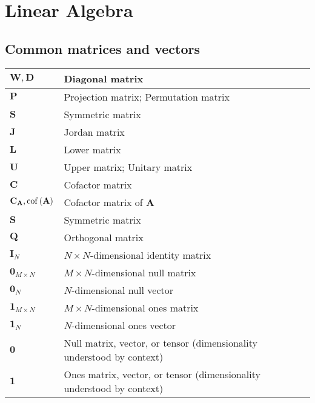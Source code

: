 \section{Linear Algebra}
\subsection{Common matrices and vectors}
\begin{xltabular}{\textwidth}{XX}
	\(\mathbf{W}, \mathbf{D}\)                  & Diagonal matrix                                                       \\ \hline
	\(\mathbf{P}\)                              & Projection matrix; Permutation matrix                                 \\ \hline
	\(\mathbf{S}\)                              & Symmetric matrix                                 \\ \hline
	\(\mathbf{J}\)                              & Jordan matrix                                                         \\ \hline
	\(\mathbf{L}\)                              & Lower matrix                                                          \\ \hline
	\(\mathbf{U}\)                              & Upper matrix; Unitary matrix                                                          \\ \hline
	\(\mathbf{C}\)                              & Cofactor matrix                                                       \\ \hline
	\(\mathbf{C}_\mathbf{A}, \operatorname{cof}\left(\mathbf{A}\right)\) & Cofactor matrix of \(\mathbf{A}\)                                     \\ \hline
	\(\mathbf{S}\)                              & Symmetric matrix                                                      \\ \hline
	\(\mathbf{Q}\)                              & Orthogonal matrix                                                     \\ \hline
	\(\mathbf{I}_N\)                            & \(N\times N\)-dimensional identity matrix                             \\ \hline
	\(\mathbf{0}_{M\times N}\)                  & \(M\times N\)-dimensional null matrix                                 \\ \hline
	\(\mathbf{0}_{N}\)                          & \(N\)-dimensional null vector                                         \\ \hline
	\(\mathbf{1}_{M\times N}\)                  & \(M\times N\)-dimensional ones matrix                                 \\ \hline
	\(\mathbf{1}_{N}\)                          & \(N\)-dimensional ones vector                                         \\ \hline
	\(\mathbf{0}\)                              & Null matrix, vector, or tensor (dimensionality understood by context) \\ \hline
	\(\mathbf{1}\)                              & Ones matrix, vector, or tensor (dimensionality understood by context) \\
\end{xltabular}


